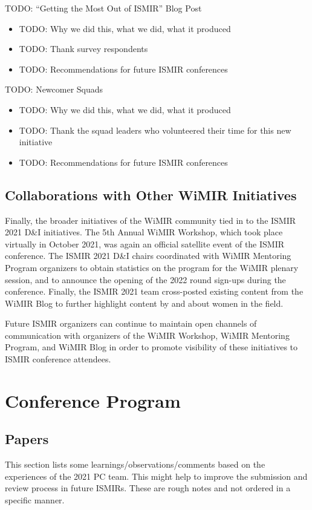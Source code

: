 \documentclass[%
10pt,								%
]
{scrartcl}
\begin{document}
        TODO: ``Getting the Most Out of ISMIR'' Blog Post
        \begin{itemize}
            \item   TODO: Why we did this, what we did, what it produced
            \item   TODO: Thank survey respondents
            \item   TODO: Recommendations for future ISMIR conferences
        \end{itemize}

       
        TODO: Newcomer Squads
        \begin{itemize}
            \item   TODO: Why we did this, what we did, what it produced
            \item   TODO: Thank the squad leaders who volunteered their time for this new initiative
            \item   TODO: Recommendations for future ISMIR conferences
        \end{itemize}
        

    \subsection{Collaborations with Other WiMIR Initiatives}
        Finally, the broader initiatives of the WiMIR community tied in to the ISMIR 2021 D\&I initiatives. The 5th Annual WiMIR Workshop, which took place virtually in October 2021, was again an official satellite event of the ISMIR conference. The ISMIR 2021 D\&I chairs coordinated with WiMIR Mentoring Program organizers to obtain statistics on the program for the WiMIR plenary session, and to announce the opening of the 2022 round sign-ups during the conference. Finally, the ISMIR 2021 team cross-posted existing content from the WiMIR Blog to further highlight content by and about women in the field. 

        Future ISMIR organizers can continue to maintain open channels of communication with organizers of the WiMIR Workshop, WiMIR Mentoring Program, and WiMIR Blog in order to promote visibility of these initiatives to ISMIR conference attendees.

    
\section{Conference Program}
    \subsection{Papers}
        This section lists some learnings/observations/comments based on the experiences of the 2021 PC team. This might help to improve the submission and review process in future ISMIRs. These are rough notes and not ordered in a specific manner.
        
\end{document}
